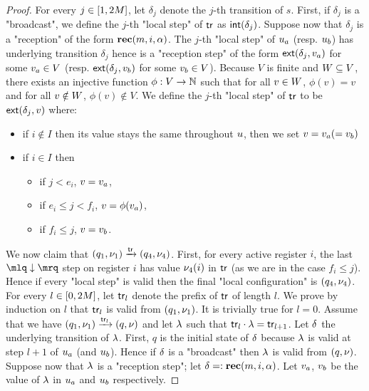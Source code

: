 \begin{proof}
	For every $j \in [1,2M]$, let $\delta_j$ denote the $j$-th transition of $s$. First, if  $\delta_j$ is a "broadcast", we define the $j$-th "local step" of $\mathsf{tr}$ as $\mathsf{int}(\delta_j)$. 
	Suppose now that $\delta_j$ is a "reception" of the form $\textbf{rec}(m, i, \alpha)$. The $j$-th "local step" of $u_a$ (resp. $u_b$) has underlying transition $\delta_j$ hence is a "reception step" of the form $\mathsf{ext}(\delta_j,v_a)$ for some $v_a \in V$ (resp. $\mathsf{ext}(\delta_j,v_b)$ for some $v_b \in V$).
	Because $V$ is finite and $W \subseteq V$, there exists an injective function $\phi: V \rightarrow \mathbb{N}$ such that for all $v \in W$, $\phi(v) = v$ and for all $v \notin W$, $\phi(v) \notin V$.
	We define the $j$-th "local step" of $\mathsf{tr}$ to be $\mathsf{ext}(\delta_j,v)$ where:
	\begin{itemize}
		\item if $i \notin I$ then its value stays the same throughout $u$, then we set $v = v_a (= v_b)$ 
		\item if $i \in I$ then  
		\begin{itemize}
			\item if $j < e_i$, $v = v_a$,
			\item if $e_i \leq j < f_i$, $v = \phi(v_a)$,
			\item if $f_i \leq j$, $v = v_b$.
		\end{itemize}
	\end{itemize}
	We now claim that $(q_1,\nu_1) \xrightarrow{\mathsf{tr}} (q_4,\nu_4)$. 
	First, for every active register $i$, the last $\quotemarks{\enregact}$ step on register $i$ has value $\nu_4(i)$ in $\mathsf{tr}$ (as we are in the case $f_i \leq j$). Hence if every "local step" is valid then the final "local configuration" is $(q_4, \nu_4)$.
	For every $l \in [0,2M]$, let $\mathsf{tr}_l$ denote the prefix of $\mathsf{tr}$ of length $l$.
	We prove by induction on $l$ that $\mathsf{tr}_l$ is valid from $(q_1, \nu_1)$. It is trivially true for $l =0$. Assume that we have $(q_1, \nu_1) \xrightarrow{\mathsf{tr}_l} (q, \nu)$ and let $\lambda$ such that $\mathsf{tr}_l \cdot \lambda = \mathsf{tr}_{l+1}$. Let $\delta$ the underlying transition of $\lambda$.
	First, $q$ is the initial state of $\delta$ because $\lambda$ is valid at step $l+1$ of $u_a$ (and $u_b$). Hence if $\delta$ is a "broadcast" then $\lambda$ is valid from $(q,\nu)$. Suppose now that $\lambda$ is a "reception step"; let $\delta =: \textbf{rec}(m, i, \alpha)$.
	Let $v_a$, $v_b$ be the value of $\lambda$ in $u_a$ and $u_b$ respectively.


\end{proof}
